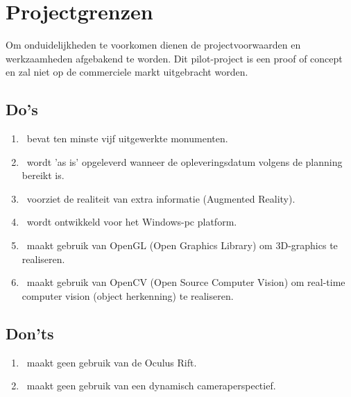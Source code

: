 \chapter{Projectgrenzen} \label{cha:projectgrenzen}
Om onduidelijkheden te voorkomen dienen de projectvoorwaarden en werkzaamheden afgebakend te worden. Dit pilot-project is een proof of concept en zal niet op de commerciele markt uitgebracht worden.
\section{Do's} \label{sec:do's}
\begin{enumerate}
  \item \projectname\ bevat ten minste vijf uitgewerkte monumenten.
  \item \projectname\ wordt 'as is' opgeleverd wanneer de opleveringsdatum volgens de planning bereikt is.
  \item \projectname\ voorziet de realiteit van extra informatie (Augmented Reality).
  \item \projectname\ wordt ontwikkeld voor het Windows-pc platform.
  \item \projectname\ maakt gebruik van OpenGL (Open Graphics Library) om 3D-graphics te realiseren.
  \item \projectname\ maakt gebruik van OpenCV (Open Source Computer Vision) om real-time computer vision (object herkenning) te realiseren.
\end{enumerate}
\section{Don'ts} \label{sec:don'ts}
\begin{enumerate}
  \item \projectname\ maakt geen gebruik van de Oculus Rift.
  \item \projectname\ maakt geen gebruik van een dynamisch cameraperspectief.
\end{enumerate}